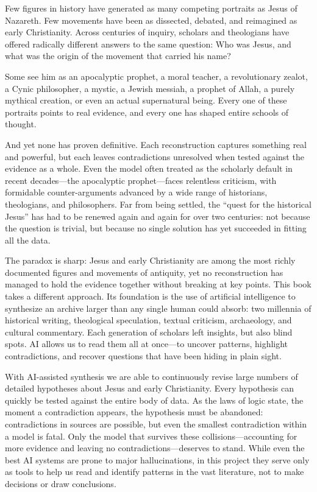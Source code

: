 Few figures in history have generated as many competing portraits as Jesus of Nazareth.
Few movements have been as dissected, debated, and reimagined as early Christianity.
Across centuries of inquiry, scholars and theologians have offered radically different answers to the same question: Who was Jesus, and what was the origin of the movement that carried his name?

Some see him as an apocalyptic prophet, a moral teacher, a revolutionary zealot, a Cynic philosopher, a mystic, a Jewish messiah, a prophet of Allah, a purely mythical creation, or even an actual supernatural being.
Every one of these portraits points to real evidence, and every one has shaped entire schools of thought.

And yet none has proven definitive.
Each reconstruction captures something real and powerful, but each leaves contradictions unresolved when tested against the evidence as a whole.
Even the model often treated as the scholarly default in recent decades—the apocalyptic prophet—faces relentless criticism, with formidable counter-arguments advanced by a wide range of historians, theologians, and philosophers.
Far from being settled, the ``quest for the historical Jesus'' has had to be renewed again and again for over two centuries: not because the question is trivial, but because no single solution has yet succeeded in fitting all the data.

The paradox is sharp: Jesus and early Christianity are among the most richly documented figures and movements of antiquity, yet no reconstruction has managed to hold the evidence together without breaking at key points.
This book takes a different approach.
Its foundation is the use of artificial intelligence to synthesize an archive larger than any single human could absorb: two millennia of historical writing, theological speculation, textual criticism, archaeology, and cultural commentary.
Each generation of scholars left insights, but also blind spots.
AI allows us to read them all at once—to uncover patterns, highlight contradictions, and recover questions that have been hiding in plain sight.

With AI-assisted synthesis we are able to continuously revise large numbers of detailed hypotheses about Jesus and early Christianity.
Every hypothesis can quickly be tested against the entire body of data.
As the laws of logic state, the moment a contradiction appears, the hypothesis must be abandoned: contradictions in sources are possible, but even the smallest contradiction within a model is fatal.
Only the model that survives these collisions---accounting for more evidence and leaving no contradictions---deserves to stand.
While even the best AI systems are prone to major hallucinations, in this project they serve only as tools to help us read and identify patterns in the vast literature, not to make decisions or draw conclusions.

